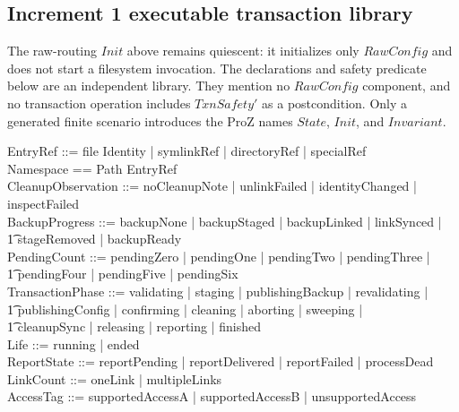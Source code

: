 \documentclass{article}
\begin{document}
\subsection{Increment 1 executable transaction library}

The raw-routing $Init$ above remains quiescent: it initializes only
$RawConfig$ and does not start a filesystem invocation.  The declarations and
safety predicate below are an independent library.  They mention no
$RawConfig$ component, and no transaction operation includes $TxnSafety'$ as a
postcondition.  Only a generated finite scenario introduces the ProZ names
$State$, $Init$, and $Invariant$.

\begin{zed}
	EntryRef ::= file \ldata Identity \rdata | symlinkRef | directoryRef | specialRef \\
	Namespace == Path \pfun EntryRef \\
	CleanupObservation ::= noCleanupNote | unlinkFailed | identityChanged | inspectFailed \\
	BackupProgress ::= backupNone | backupStaged | backupLinked | linkSynced | \\
	\t1 stageRemoved | backupReady \\
	PendingCount ::= pendingZero | pendingOne | pendingTwo | pendingThree | \\
	\t1 pendingFour | pendingFive | pendingSix \\
	TransactionPhase ::= validating | staging | publishingBackup | revalidating | \\
	\t1 publishingConfig | confirming | cleaning | aborting | sweeping | \\
	\t1 cleanupSync | releasing | reporting | finished \\
	Life ::= running | ended \\
	ReportState ::= reportPending | reportDelivered | reportFailed | processDead \\
	LinkCount ::= oneLink | multipleLinks \\
	AccessTag ::= supportedAccessA | supportedAccessB | unsupportedAccess
\end{zed}
\end{document}
